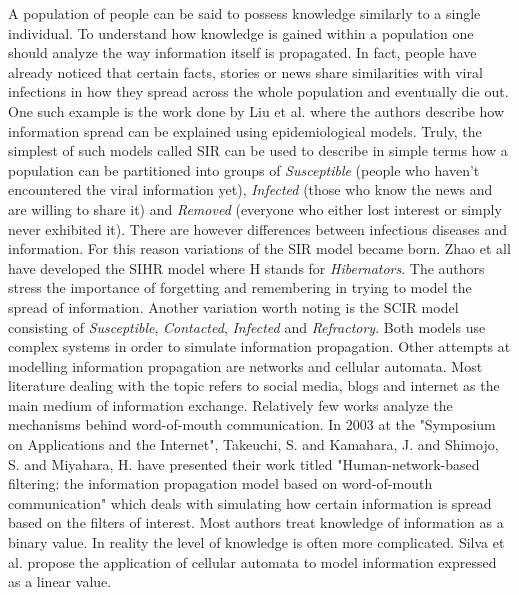 A population of people can be said to possess knowledge similarly to a single individual.
To understand how knowledge is gained within a population one should analyze the way information itself is propagated.
In fact, people have already noticed that certain facts, stories or news share similarities with viral infections in how they spread across the whole population and eventually die out.
One such example is the work done by Liu et al.\cite{liu2016} where the authors describe how information spread can be explained using epidemiological models.
Truly, the simplest of such models called SIR\cite{weiss2013sir} can be used to describe in simple terms how a population can be partitioned into groups of \emph{Susceptible} (people who haven't encountered the viral information yet), \emph{Infected} (those who know the news and are willing to share it) and \emph{Removed} (everyone who either lost interest or simply never exhibited it).
There are however differences between infectious diseases and information.
For this reason variations of the SIR model became born.
Zhao et all\cite{zhao2012sihr} have developed the SIHR model where H stands for \emph{Hibernators}.
The authors stress the importance of forgetting and remembering in trying to model the spread of information.
Another variation worth noting is the SCIR model consisting of \emph{Susceptible}, \emph{Contacted}, \emph{Infected} and \emph{Refractory}\cite{xiong2012scir}.
Both models use complex systems in order to simulate information propagation.
Other attempts at modelling information propagation are networks\cite{rodriguez2013} and cellular automata\cite{silva2020}.
Most literature dealing with the topic refers to social media, blogs and internet as the main medium of information exchange.
Relatively few works analyze the mechanisms behind word-of-mouth communication.
In 2003 at the "Symposium on Applications and the Internet", Takeuchi, S. and Kamahara, J. and Shimojo, S. and Miyahara, H. have presented their work titled "Human-network-based filtering: the information propagation model based on word-of-mouth communication" which deals with simulating how certain information is spread based on the filters of interest\cite{takeuchi1183031}.
Most authors treat knowledge of information as a binary value.
In reality the level of knowledge is often more complicated.
Silva et al.\cite{silva2020} propose the application of cellular automata to model information expressed as a linear value.
